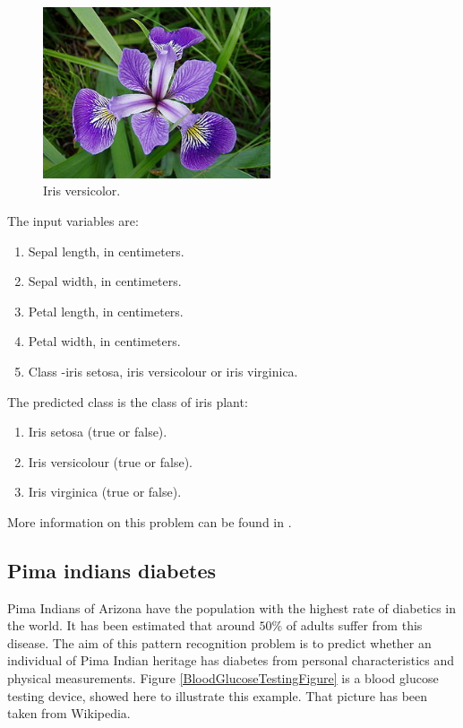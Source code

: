 \begin{figure}[!hbp]
\begin{center}
\includegraphics[width=0.6\textwidth]{pattern_recognition/iris_versicolor}
\caption{Iris versicolor.}\label{IrisPlantFigure}
\end{center}
\end{figure}

The input variables are:

\begin{enumerate}
\item Sepal length, in centimeters.
\item Sepal width, in centimeters.
\item Petal length, in centimeters.
\item Petal width, in centimeters.
\item Class -iris setosa, iris versicolour or iris virginica.
\end{enumerate}

The predicted class is the class of iris plant:
 
\begin{enumerate}
\item Iris setosa (true or false).
\item Iris versicolour (true or false).
\item Iris virginica (true or false).
\end{enumerate}

More information on this problem can be found in \cite{UCI}.

\subsection*{Pima indians diabetes}

Pima Indians of Arizona have the population with the highest rate of diabetics in the world. 
It has been estimated that around $50\%$ of adults suffer from this disease. 
The aim of this pattern recognition problem is to predict whether an individual of Pima Indian heritage has diabetes from personal characteristics and physical measurements.
Figure \ref{BloodGlucoseTestingFigure} is a blood glucose testing device, showed here to illustrate this example. 
That picture has been taken from Wikipedia. 

